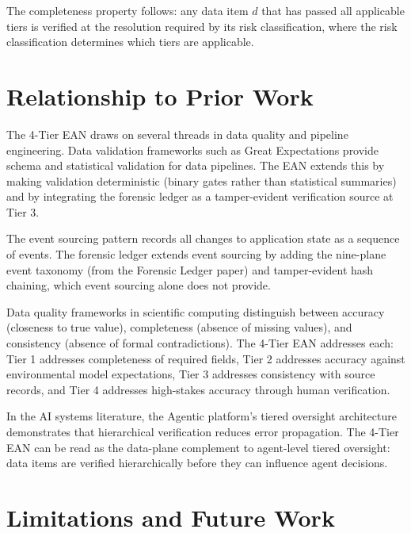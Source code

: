 \documentclass[12pt]{article}
\begin{document}
The completeness property follows: any data item $d$ that has passed all applicable tiers is verified at the resolution required by its risk classification, where the risk classification determines which tiers are applicable.

\section{Relationship to Prior Work}
\label{sec:prior}

The 4-Tier EAN draws on several threads in data quality and pipeline engineering. Data validation frameworks such as Great Expectations \cite{great_expectations} provide schema and statistical validation for data pipelines. The EAN extends this by making validation deterministic (binary gates rather than statistical summaries) and by integrating the forensic ledger as a tamper-evident verification source at Tier 3.

The event sourcing pattern \cite{fowler2006events} records all changes to application state as a sequence of events. The forensic ledger extends event sourcing by adding the nine-plane event taxonomy (from the Forensic Ledger paper) and tamper-evident hash chaining, which event sourcing alone does not provide.

Data quality frameworks in scientific computing \cite{redman1993measuring} distinguish between accuracy (closeness to true value), completeness (absence of missing values), and consistency (absence of formal contradictions). The 4-Tier EAN addresses each: Tier 1 addresses completeness of required fields, Tier 2 addresses accuracy against environmental model expectations, Tier 3 addresses consistency with source records, and Tier 4 addresses high-stakes accuracy through human verification.

In the AI systems literature, the Agentic platform's tiered oversight architecture \cite{kim2025tao} demonstrates that hierarchical verification reduces error propagation. The 4-Tier EAN can be read as the data-plane complement to agent-level tiered oversight: data items are verified hierarchically before they can influence agent decisions.

\section{Limitations and Future Work}
\label{sec:limitations}
\end{document}

